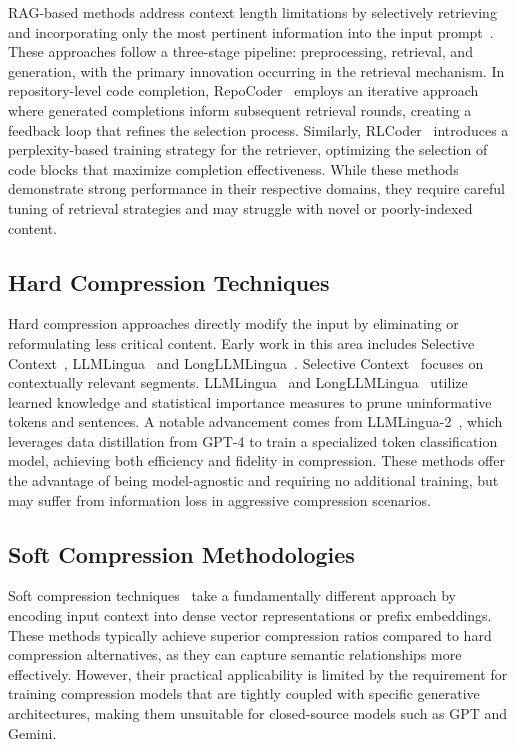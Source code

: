 RAG-based methods address context length limitations by selectively retrieving and incorporating only the most pertinent information into the input prompt~\cite{parvez2021retrievalaugmentedcodegeneration}. These approaches follow a three-stage pipeline: preprocessing, retrieval, and generation, with the primary innovation occurring in the retrieval mechanism. In repository-level code completion, RepoCoder~\cite{zhang2023repocoder} employs an iterative approach where generated completions inform subsequent retrieval rounds, creating a feedback loop that refines the selection process. Similarly, RLCoder~\cite{wang2024rlcoder} introduces a perplexity-based training strategy for the retriever, optimizing the selection of code blocks that maximize completion effectiveness. While these methods demonstrate strong performance in their respective domains, they require careful tuning of retrieval strategies and may struggle with novel or poorly-indexed content.

\subsection{Hard Compression Techniques}
Hard compression approaches directly modify the input by eliminating or reformulating less critical content. Early work in this area includes Selective Context~\cite{li-etal-2023-compressing}, LLMLingua~\cite{jiang2023llmlingua} and LongLLMLingua~\cite{jiang2023longllmlingua}. Selective Context~\cite{li-etal-2023-compressing}  focuses on contextually relevant segments. LLMLingua~\cite{jiang2023llmlingua} and LongLLMLingua~\cite{jiang2023longllmlingua} utilize learned knowledge and statistical importance measures to prune uninformative tokens and sentences. A notable advancement comes from LLMLingua-2~\cite{pan2024llmlingua}, which leverages data distillation from GPT-4 to train a specialized token classification model, achieving both efficiency and fidelity in compression. These methods offer the advantage of being model-agnostic and requiring no additional training, but may suffer from information loss in aggressive compression scenarios.

\subsection{Soft Compression Methodologies}
Soft compression techniques~\cite{chevalier2023adapting,mu2024learning,500xcompressor} take a fundamentally different approach by encoding input context into dense vector representations or prefix embeddings. These methods typically achieve superior compression ratios compared to hard compression alternatives, as they can capture semantic relationships more effectively. However, their practical applicability is limited by the requirement for training compression models that are tightly coupled with specific generative architectures, making them unsuitable for closed-source models such as GPT and Gemini.

